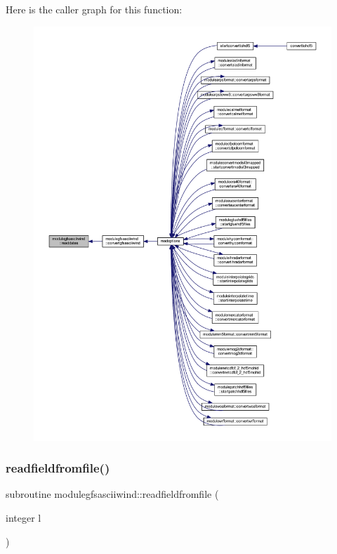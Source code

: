 Here is the caller graph for this function\+:\nopagebreak
\begin{figure}[H]
\begin{center}
\leavevmode
\includegraphics[width=350pt]{namespacemodulegfsasciiwind_ab9051f99673c32b2f6b1020ab37aa9c1_icgraph}
\end{center}
\end{figure}
\mbox{\label{namespacemodulegfsasciiwind_a69fe620e0a4b751e1ee827c3e8f01e6c}} 
\subsubsection{\texorpdfstring{readfieldfromfile()}{readfieldfromfile()}}
{\footnotesize\ttfamily subroutine modulegfsasciiwind\+::readfieldfromfile (\begin{DoxyParamCaption}\item[{integer}]{l }\end{DoxyParamCaption})\hspace{0.3cm}{\ttfamily [private]}}

